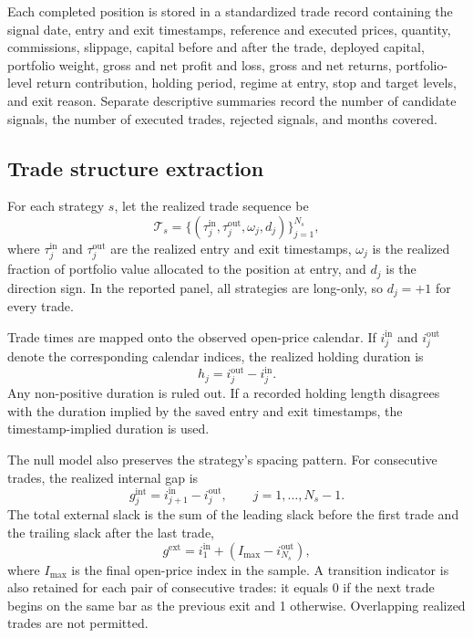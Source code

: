 \documentclass[preprint,12pt]{elsarticle}
\theoremstyle{definition}
\begin{document}
Each completed position is stored in a standardized trade record containing the signal date, entry and exit timestamps, reference and executed prices, quantity, commissions, slippage, capital before and after the trade, deployed capital, portfolio weight, gross and net profit and loss, gross and net returns, portfolio-level return contribution, holding period, regime at entry, stop and target levels, and exit reason. Separate descriptive summaries record the number of candidate signals, the number of executed trades, rejected signals, and months covered.

\subsection{Trade structure extraction}

For each strategy \(s\), let the realized trade sequence be
\begin{equation}
\mathcal{T}_s=\{(\tau^{\mathrm{in}}_j,\tau^{\mathrm{out}}_j,\omega_j,d_j)\}_{j=1}^{N_s},
\end{equation}
where \(\tau^{\mathrm{in}}_j\) and \(\tau^{\mathrm{out}}_j\) are the realized entry and exit timestamps, \(\omega_j\) is the realized fraction of portfolio value allocated to the position at entry, and \(d_j\) is the direction sign. In the reported panel, all strategies are long-only, so \(d_j=+1\) for every trade.

Trade times are mapped onto the observed open-price calendar. If \(i^{\mathrm{in}}_j\) and \(i^{\mathrm{out}}_j\) denote the corresponding calendar indices, the realized holding duration is
\begin{equation}
h_j=i^{\mathrm{out}}_j-i^{\mathrm{in}}_j.
\end{equation}
Any non-positive duration is ruled out. If a recorded holding length disagrees with the duration implied by the saved entry and exit timestamps, the timestamp-implied duration is used.

The null model also preserves the strategy's spacing pattern. For consecutive trades, the realized internal gap is
\begin{equation}
g^{\mathrm{int}}_j=i^{\mathrm{in}}_{j+1}-i^{\mathrm{out}}_j,\qquad j=1,\ldots,N_s-1.
\end{equation}
The total external slack is the sum of the leading slack before the first trade and the trailing slack after the last trade,
\begin{equation}
g^{\mathrm{ext}} = i^{\mathrm{in}}_1 + \left(I_{\max}-i^{\mathrm{out}}_{N_s}\right),
\end{equation}
where \(I_{\max}\) is the final open-price index in the sample. A transition indicator is also retained for each pair of consecutive trades: it equals 0 if the next trade begins on the same bar as the previous exit and 1 otherwise. Overlapping realized trades are not permitted.
\end{document}
